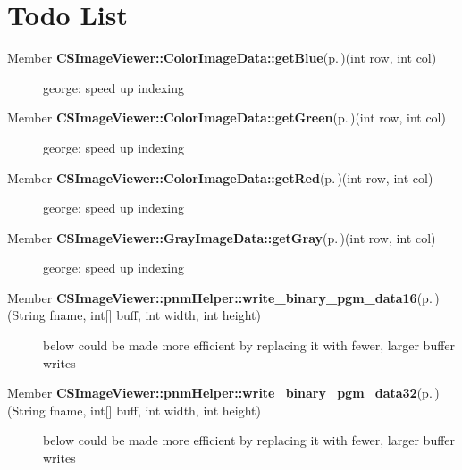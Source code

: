 \section{Todo List}\label{todo}
\label{todo__todo000003}
 \begin{description}
\item[Member {\bf CSImage\-Viewer::Color\-Image\-Data::get\-Blue}{\rm (p.\,\pageref{class_c_s_image_viewer_1_1_color_image_data_2d270d661f5cfa7d4be1e66701b55376})}(int row, int col) ]george: speed up indexing \end{description}


\label{todo__todo000002}
 \begin{description}
\item[Member {\bf CSImage\-Viewer::Color\-Image\-Data::get\-Green}{\rm (p.\,\pageref{class_c_s_image_viewer_1_1_color_image_data_eb04f53da669ba68d0ddd2dfc0ce9f9e})}(int row, int col) ]george: speed up indexing \end{description}


\label{todo__todo000001}
 \begin{description}
\item[Member {\bf CSImage\-Viewer::Color\-Image\-Data::get\-Red}{\rm (p.\,\pageref{class_c_s_image_viewer_1_1_color_image_data_3c7179eb0903415f89e40451632deca4})}(int row, int col) ]george: speed up indexing \end{description}


\label{todo__todo000004}
 \begin{description}
\item[Member {\bf CSImage\-Viewer::Gray\-Image\-Data::get\-Gray}{\rm (p.\,\pageref{class_c_s_image_viewer_1_1_gray_image_data_dcb7178c700e5ead72cd80cf91d05c2e})}(int row, int col) ]george: speed up indexing \end{description}


\label{todo__todo000006}
 \begin{description}
\item[Member {\bf CSImage\-Viewer::pnm\-Helper::write\_\-binary\_\-pgm\_\-data16}{\rm (p.\,\pageref{class_c_s_image_viewer_1_1pnm_helper_b9389279b59ecaff8492133a68a59b98})}(String fname, int\mbox{[}\mbox{]} buff, int width, int height) ]below could be made more efficient by replacing it with fewer, larger buffer writes \end{description}


\label{todo__todo000007}
 \begin{description}
\item[Member {\bf CSImage\-Viewer::pnm\-Helper::write\_\-binary\_\-pgm\_\-data32}{\rm (p.\,\pageref{class_c_s_image_viewer_1_1pnm_helper_37c7b83d8f17d8e3c8a8ecafe511d070})}(String fname, int\mbox{[}\mbox{]} buff, int width, int height) ]below could be made more efficient by replacing it with fewer, larger buffer writes \end{description}


